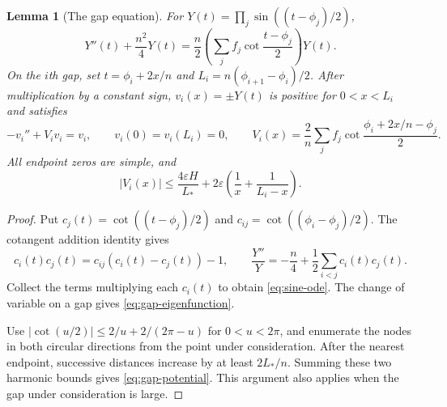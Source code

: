 \documentclass[11pt,reqno]{amsart}
\numberwithin{equation}{section}
\newtheorem{lemma}[theorem]{Lemma}
\theoremstyle{definition}
\theoremstyle{remark}
\begin{document}
\begin{lemma}[The gap equation]\label{lem:gap-equation}
For $Y(t)=\prod_j\sin((t-\phi_j)/2)$,
\begin{equation}\label{eq:sine-ode}
 Y''(t)+\frac{n^2}{4}Y(t)
 =\frac n2\left(\sum_j f_j\cot\frac{t-\phi_j}{2}\right)Y(t).
\end{equation}
On the $i$th gap, set $t=\phi_i+2x/n$ and $L_i=n(\phi_{i+1}-\phi_i)/2$. After multiplication by a constant sign, $v_i(x)=\pm Y(t)$ is positive for $0<x<L_i$ and satisfies
\begin{equation}\label{eq:gap-eigenfunction}
 -v_i''+V_i v_i=v_i,\qquad v_i(0)=v_i(L_i)=0,
 \qquad V_i(x)=\frac2n\sum_j f_j\cot\frac{\phi_i+2x/n-\phi_j}{2}.
\end{equation}
All endpoint zeros are simple, and
\begin{equation}\label{eq:gap-potential}
 |V_i(x)|\le\frac{4\varepsilon H}{L_*}
 +2\varepsilon\left(\frac1x+\frac1{L_i-x}\right).
\end{equation}
\end{lemma}
\begin{proof}
Put $c_j(t)=\cot((t-\phi_j)/2)$ and $c_{ij}=\cot((\phi_i-\phi_j)/2)$. The cotangent addition identity gives
\[
 c_i(t)c_j(t)=c_{ij}(c_i(t)-c_j(t))-1,
 \qquad \frac{Y''}{Y}=-\frac n4+\frac12\sum_{i<j}c_i(t)c_j(t).
\]
Collect the terms multiplying each $c_i(t)$ to obtain \eqref{eq:sine-ode}. The change of variable on a gap gives \eqref{eq:gap-eigenfunction}.

Use $|\cot(u/2)|\le2/u+2/(2\pi-u)$ for $0<u<2\pi$, and enumerate the nodes in both circular directions from the point under consideration. After the nearest endpoint, successive distances increase by at least $2L_*/n$. Summing these two harmonic bounds gives \eqref{eq:gap-potential}. This argument also applies when the gap under consideration is large.
\end{proof}
\end{document}
